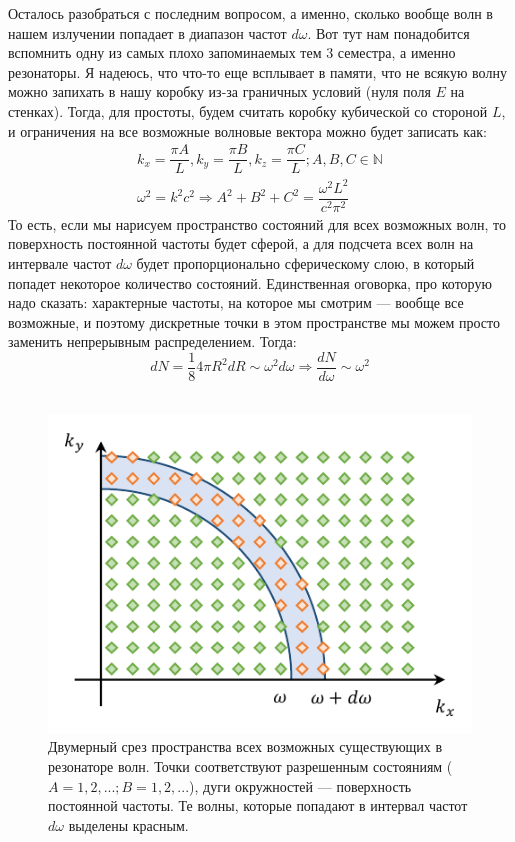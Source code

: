 \documentclass[12pt]{article}
\begin{document}
\vspace{1mm}\noindent
Осталось разобраться с последним вопросом, а именно, сколько вообще волн в нашем излучении попадает в диапазон частот $d\omega$. Вот тут нам понадобится вспомнить одну из самых плохо запоминаемых тем 3 семестра, а именно резонаторы. Я надеюсь, что что-то еще всплывает в памяти, что не всякую волну можно запихать в нашу коробку из-за граничных условий (нуля поля $E$ на стенках). Тогда, для простоты, будем считать коробку кубической со стороной $L$, и ограничения на все возможные волновые вектора можно будет записать как:
\begin{gather*}
    k_x = \dfrac{\pi A}{L}, k_y = \dfrac{\pi B}{L}, k_z = \dfrac{\pi C}{L}; A, B, C\in \mathbb{N}\\
    \omega^2 = k^2c^2 \Rightarrow A^2+B^2+C^2 = \dfrac{\omega^2L^2}{c^2\pi^2}
\end{gather*}
То есть, если мы нарисуем пространство состояний для всех возможных волн, то поверхность постоянной частоты будет сферой, а для подсчета всех волн на интервале частот $d\omega$ будет пропорционально сферическому слою, в который попадет некоторое количество состояний. Единственная оговорка, про которую надо сказать: характерные частоты, на которое мы смотрим --- вообще все возможные, и поэтому дискретные точки в этом пространстве мы можем просто заменить непрерывным распределением. Тогда:
\begin{equation}
    dN = \frac{1}{8}4\pi R^2 dR \sim \omega^2d\omega \Rightarrow \frac{dN}{d\omega} \sim \omega^2
\end{equation}
\\
\begin{figure}[h]
    \centering
    \includegraphics[scale=1.5]{Seminar_01/pics/pic_03.pdf}
    \caption{Двумерный срез пространства всех возможных существующих в резонаторе волн. Точки соответствуют разрешенным состояниям ($A=1, 2, ...; B = 1, 2, ...$), дуги окружностей --- поверхность постоянной частоты. Те волны, которые попадают в интервал частот $d\omega$ выделены красным.}
    \label{fig:sem_01_dN_domega}
\end{figure}
\end{document}
